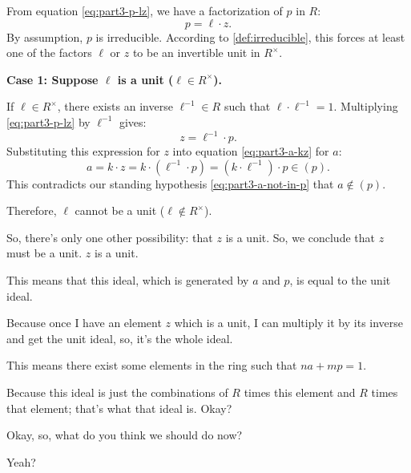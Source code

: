 \begin{proofWrapper}
\begin{content}
From equation \eqref{eq:part3-p-lz}, we have a factorization of $p$ in $R$:
\[
p = \ell \cdot z.
\]
By assumption, $p$ is irreducible. According to \cref{def:irreducible}, this forces at least one of the factors $\ell$ or $z$ to be an invertible unit in $R^\times$.

\textbf{Case 1: Suppose $\ell$ is a unit ($\ell \in R^\times$).}

If $\ell \in R^\times$, there exists an inverse $\ell^{-1} \in R$ such that $\ell \cdot \ell^{-1} = 1$. Multiplying \eqref{eq:part3-p-lz} by $\ell^{-1}$ gives:
\begin{equation}\label{eq:part3-z-is-linv-p}
z = \ell^{-1} \cdot p.
\end{equation}
Substituting this expression for $z$ into equation \eqref{eq:part3-a-kz} for $a$:
\begin{equation}\label{eq:part3-a-in-p-contradiction}
a = k \cdot z = k \cdot (\ell^{-1} \cdot p) = (k \cdot \ell^{-1}) \cdot p \in (p).
\end{equation}
This contradicts our standing hypothesis \eqref{eq:part3-a-not-in-p} that $a \notin (p)$. 

Therefore, $\ell$ cannot be a unit ($\ell \notin R^\times$).
\end{content}

\begin{speech}[00:54:02 - 00:55:24]
So, there's only one other possibility: that $z$ is a unit. So, we conclude that $z$ must be a unit.  $z$ is a unit.

This means that this ideal, which is generated by $a$ and $p$, is equal to the unit ideal. 

Because once I have an element $z$ which is a unit, I can multiply it by its inverse and get the unit ideal, so, it's the whole ideal.

This means there exist some elements in the ring such that $na + mp = 1$. 

Because this ideal is just the combinations of $R$ times this element and $R$ times that element; that's what that ideal is. Okay?

Okay, so, what do you think we should do now?

Yeah?
\end{speech}


\end{proofWrapper}
